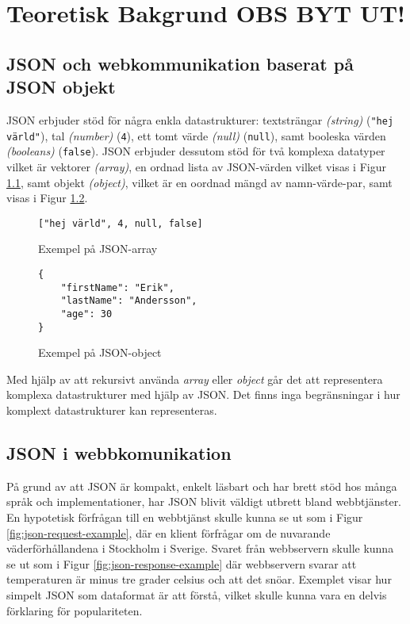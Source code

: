 \chapter{Teoretisk Bakgrund OBS BYT UT!}
\label{sec:teori}

\section{JSON och webkommunikation baserat på JSON objekt}
\label{sec:teori:json}
JSON erbjuder stöd för några enkla datastrukturer: textsträngar \textit{(string)} (\texttt{"hej värld"}), tal \textit{(number)} (\texttt{4}), ett tomt värde \textit{(null)} (\texttt{null}), samt booleska värden \textit{(booleans)} (\texttt{false}). JSON erbjuder dessutom stöd för två komplexa datatyper vilket är vektorer \textit{(array)}, en ordnad lista av JSON-värden vilket visas i Figur \ref{fig:json-array-example}, samt objekt \textit{(object)}, vilket är en oordnad mängd av namn-värde-par, samt visas i Figur \ref{fig:json-object-example}.

\begin{figure}
	\begin{verbatim}
["hej värld", 4, null, false]
	\end{verbatim}
	\vspace{-1.7em}
	\caption{Exempel på JSON-array}
	\label{fig:json-array-example}
\end{figure}

\begin{figure}
	\begin{verbatim}
{
	"firstName": "Erik",
	"lastName": "Andersson",
	"age": 30
}
	\end{verbatim}
	\vspace{-1.7em}
	\caption{Exempel på JSON-object}
	\label{fig:json-object-example}
\end{figure}

\noindent
Med hjälp av att rekursivt använda \textit{array} eller \textit{object} går det att representera komplexa datastrukturer med hjälp av JSON. Det finns inga begränsningar i hur komplext datastrukturer kan representeras.

\section{JSON i webbkomunikation}
\label{sec:teori:json-web}
På grund av att JSON är kompakt, enkelt läsbart och har brett stöd hos många språk och implementationer, har JSON blivit väldigt utbrett bland webbtjänster. En hypotetisk förfrågan till en webbtjänst skulle kunna se ut som i Figur \ref{fig:json-request-example}, där en klient förfrågar om de nuvarande väderförhållandena i Stockholm i Sverige. Svaret från webbservern skulle kunna se ut som i Figur \ref{fig:json-response-example} där webbservern svarar att temperaturen är minus tre grader celsius och att det snöar. Exemplet visar hur simpelt JSON som dataformat är att förstå, vilket skulle kunna vara en delvis förklaring för populariteten.

